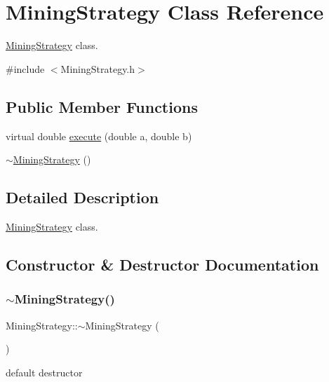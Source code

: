 \hypertarget{classMiningStrategy}{}\section{Mining\+Strategy Class Reference}
\label{classMiningStrategy}


\hyperlink{classMiningStrategy}{Mining\+Strategy} class.  




{\ttfamily \#include $<$Mining\+Strategy.\+h$>$}

\subsection*{Public Member Functions}
\begin{DoxyCompactItemize}
\item 
virtual double \hyperlink{classMiningStrategy_ace2ad68881b60573b90921a8087aee75}{execute} (double a, double b)
\item 
\hyperlink{classMiningStrategy_a9d57c0f71bd7bcc4c13360b9406ceb8c}{$\sim$\+Mining\+Strategy} ()
\end{DoxyCompactItemize}


\subsection{Detailed Description}
\hyperlink{classMiningStrategy}{Mining\+Strategy} class. 

\subsection{Constructor \& Destructor Documentation}
\mbox{\label{classMiningStrategy_a9d57c0f71bd7bcc4c13360b9406ceb8c}} 
\subsubsection{\texorpdfstring{$\sim$\+Mining\+Strategy()}{~MiningStrategy()}}
{\footnotesize\ttfamily Mining\+Strategy\+::$\sim$\+Mining\+Strategy (\begin{DoxyParamCaption}{ }\end{DoxyParamCaption})}

default destructor 

